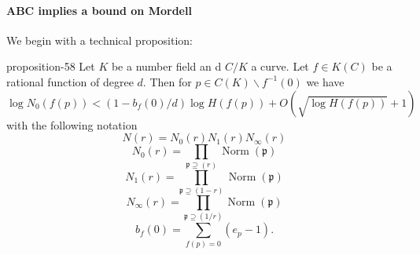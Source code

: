\documentclass[10pt,]{book}
\numberwithin{equation}{section}
\newcommand{\ideal}[1]{\mathfrak{#1}}
\newcommand{\inv}{^{-1}}
\DeclareMathOperator{\norm}{Norm}
\newcommand{\lt}{<}
\begin{document}
\paragraph[{ABC implies a bound on Mordell}]{ABC implies a bound on Mordell}\hypertarget{paragraphs-18}{}
\hypertarget{p-686}{}%
We begin with a technical proposition:%
\begin{proposition}{}{}{proposition-58}%
\hypertarget{p-687}{}%
Let \(K\) be a number field an d \(C/K\) a  curve. Let \(f \in K(C)\) be a rational function of degree \(d\). Then for \(p \in C(K) \smallsetminus f\inv(0)\) we have%
\begin{equation*}
\log N_0(f(p)) \lt (1- b_f(0)/d) \log H(f(p)) + O(\sqrt{\log H(f(p))} + 1)
\end{equation*}
with the following notation%
\begin{equation*}
N(r)  =N_0(r) N_1(r) N_\infty(r)
\end{equation*}
%
\begin{equation*}
N_0(r) = \prod_{\ideal p \supseteq (r)} \norm(\ideal p)
\end{equation*}
%
\begin{equation*}
N_1(r) = \prod_{\ideal p \supseteq (1-r)} \norm(\ideal p)
\end{equation*}
%
\begin{equation*}
N_\infty(r) = \prod_{\ideal p \supseteq (1/r)} \norm(\ideal p)
\end{equation*}
%
\begin{equation*}
b_f(0) = \sum_{f(p) = 0} (e_p - 1)\text{.}
\end{equation*}
%
\end{proposition}
\end{document}
